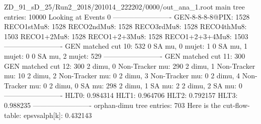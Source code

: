 ZD_91_sD_25/Run2_2018/201014_222202/0000/out_ana_1.root
main tree entries: 10000
Looking at Events 0
-------------------------
GEN-8-8-8-8@PIX: 1528
RECO1stMu8: 1528
RECO2ndMu8: 1528
RECO3rdMu8: 1528
RECO4thMu8: 1503
RECO1+2Mu8: 1528
RECO1+2+3Mu8: 1528
RECO1+2+3+4Mu8: 1503
-------------------------
GEN matched cut 10: 532
0 SA mu, 0 mujet: 1
0 SA mu, 1 mujet: 0
0 SA mu, 2 mujet: 529
-------------------------
GEN matched cut 11: 300
GEN matched cut 12: 300
2 dimu, 0 Non-Tracker mu: 290
2 dimu, 1 Non-Tracker mu: 10
2 dimu, 2 Non-Tracker mu: 0
2 dimu, 3 Non-Tracker mu: 0
2 dimu, 4 Non-Tracker mu: 0
2 dimu, 0 SA mu: 298
2 dimu, 1 SA mu: 2
2 dimu, 2 SA mu: 0
-------------------------
HLT0: 0.984314
HLT1: 0.964706
HLT2: 0.792157
HLT3: 0.988235
-------------------------
orphan-dimu tree entries: 703
Here is the cut-flow-table:
epsvsalph[k]: 0.432143
        
